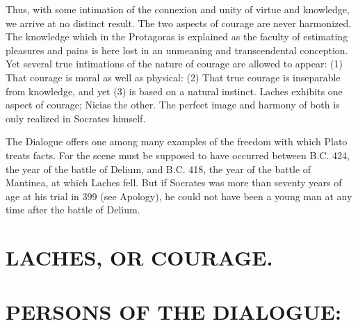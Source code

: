 \documentclass[11pt,letter]{book}
\begin{document}
\par  Thus, with some intimation of the connexion and unity of virtue and knowledge, we arrive at no distinct result. The two aspects of courage are never harmonized. The knowledge which in the Protagoras is explained as the faculty of estimating pleasures and pains is here lost in an unmeaning and transcendental conception. Yet several true intimations of the nature of courage are allowed to appear: (1) That courage is moral as well as physical: (2) That true courage is inseparable from knowledge, and yet (3) is based on a natural instinct. Laches exhibits one aspect of courage; Nicias the other. The perfect image and harmony of both is only realized in Socrates himself.

\par  The Dialogue offers one among many examples of the freedom with which Plato treats facts. For the scene must be supposed to have occurred between B.C. 424, the year of the battle of Delium, and B.C. 418, the year of the battle of Mantinea, at which Laches fell. But if Socrates was more than seventy years of age at his trial in 399 (see Apology), he could not have been a young man at any time after the battle of Delium.

\par 

\par 
\section{
      LACHES,  OR COURAGE.
    }
\par 
\section{
      PERSONS OF THE DIALOGUE:
    } 
\par 

\par 
\end{document}
